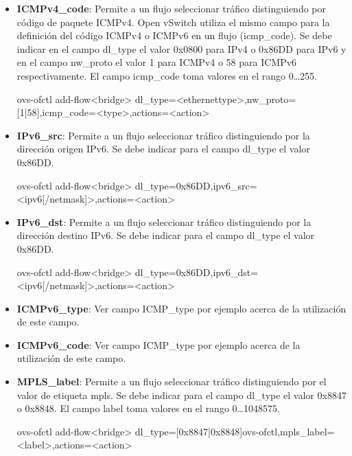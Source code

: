 \begin{itemize}
\item \textbf{ICMPv4\_code}: Permite a un flujo seleccionar tr\'afico distinguiendo por código de paquete ICMPv4. Open vSwitch utiliza el mismo campo para la definici\'on del c\'odigo ICMPv4 o ICMPv6 en un flujo (icmp\_code). Se debe indicar en el campo dl\_type el valor 0x0800 para IPv4 o 0x86DD para IPv6 y en el campo nw\_proto el valor 1 para ICMPv4 o 58 para ICMPv6 respectivamente. El campo icmp\_code toma valores en el rango 0\dots 255.

\begin{center}
ovs-ofctl add-flow<bridge> dl\_type=<ethernettype>,nw\_proto=[1|58],icmp\_code=<type>,actions=<action>
\end{center}

\item \textbf{IPv6\_src}: Permite a un flujo seleccionar tr\'afico distinguiendo por la dirección origen IPv6. Se debe indicar para el campo dl\_type el valor 0x86DD. 

\begin{center}
ovs-ofctl add-flow<bridge> dl\_type=0x86DD,ipv6\_src=<ipv6[/netmask]>,actions=<action>
\end{center}

\item \textbf{IPv6\_dst}: Permite a un flujo seleccionar tr\'afico distinguiendo por la dirección destino IPv6. Se debe indicar para el campo dl\_type el valor 0x86DD. 

\begin{center}
ovs-ofctl add-flow<bridge> dl\_type=0x86DD,ipv6\_dst=<ipv6[/netmask]>,actions=<action>
\end{center}

\item \textbf{ICMPv6\_type}: Ver campo ICMP\_type por ejemplo acerca de la utilización de este campo. 

\item \textbf{ICMPv6\_code}: Ver campo ICMP\_type por ejemplo acerca de la utilización de este campo. 

\item \textbf{MPLS\_label}:  Permite a un flujo seleccionar tr\'afico distinguiendo por el valor de etiqueta mpls. Se debe indicar para el campo dl\_type el valor 0x8847 o 0x8848. El campo label toma valores en el rango 0\dots 1048575.

\begin{center}
ovs-ofctl add-flow<bridge> dl\_type=[0x8847|0x8848]ovs-ofctl,mpls\_label=<label>,actions=<action>
\end{center}


\end{itemize}
